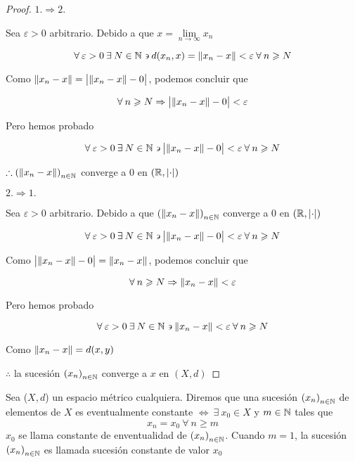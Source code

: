 \begin{proof}
    $1. \Rightarrow 2.$

    Sea $\varepsilon > 0$ arbitrario. Debido a que $x = \lim\limits_{n \to \infty} x_n$

    $$\forall \: \varepsilon > 0 \: \exists \: N \in \mathbb{N} \backepsilon d(x_n,x) = \norm{x_n-x} < \varepsilon \: \forall \: n \geqslant N$$

    Como $\norm{x_n - x} = \abs{\norm{x_n - x}  - 0}$, podemos concluir que

    $$\forall \: n \geqslant N \Rightarrow \abs{\norm{x_n - x}  - 0} < \varepsilon $$

    Pero hemos probado

    $$\forall \: \varepsilon > 0 \: \exists \: N \in \mathbb{N} \backepsilon \abs{\norm{x_n - x}  - 0} < \varepsilon \: \forall \: n \geqslant N$$

    $\therefore {(\norm{x_n-x})}_{n \in \mathbb{N}}$ converge a 0 en $(\mathbb{R}, \abs{\cdot})$

    $2. \Rightarrow 1.$

    Sea $\varepsilon > 0$ arbitrario. Debido a que ${(\norm{x_n-x})}_{n \in \mathbb{N}}$ converge a 0 en $(\mathbb{R}, \abs{\cdot})$

    $$\forall \: \varepsilon > 0 \: \exists \: N \in \mathbb{N} \backepsilon \abs{\norm{x_n - x}  - 0} < \varepsilon \: \forall \: n \geqslant N$$

    Como $\abs{\norm{x_n - x}  - 0} = \norm{x_n - x} $, podemos concluir que

    $$\forall \: n \geqslant N \Rightarrow \norm{x_n - x}  < \varepsilon $$

    Pero hemos probado

    $$\forall \: \varepsilon > 0 \: \exists \: N \in \mathbb{N} \backepsilon \norm{x_n - x}  < \varepsilon \: \forall \: n \geqslant N$$

    Como $\norm{x_n - x} = d(x,y)$

    $\therefore$ la sucesión ${(x_n)}_{n \in \mathbb{N}}$ converge a $x$ en $(X,d)$
\end{proof}

\begin{definition}
    Sea ($X,d$) un espacio métrico cualquiera. Diremos que una sucesión ${(x_n)}_{n \in \mathbb{N}}$ de elementos de $X$ es eventualmente constante $\iff \: \exists \: x_0 \in X$ y $m \in \mathbb{N}$ tales que
    $$x_n = x_0 \: \forall \: n \geqslant m$$
    $x_0$ se llama constante de enventualidad de ${(x_n)}_{n \in \mathbb{N}}$. Cuando $m=1$, la sucesión ${(x_n)}_{n \in \mathbb{N}}$ es llamada sucesión constante de valor $x_0$
\end{definition}

